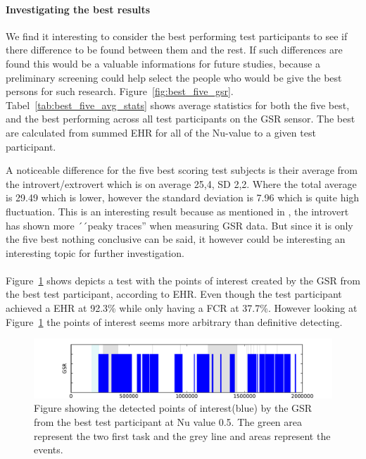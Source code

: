 \paragraph{Investigating the best results}
We find it interesting to consider the best performing test participants to see if there difference to be found between them and the rest. 
If such differences are found this would be a valuable informations for future studies, because a preliminary screening could help select the people who would be give the best persons for such research.
Figure~\ref{fig:best_five_gsr}. Tabel~\ref{tab:best_five_avg_stats} shows average statistics for both the five best, and
the best performing across all test participants on the GSR sensor. The best are calculated from summed EHR for all of the Nu-value to a given test participant.


A noticeable difference for the five best scoring test subjects is their average from the introvert/extrovert which is on average 25,4, SD 2,2.
Where the total average is 29.49 which is lower, however the standard deviation is 7.96 which is quite high fluctuation. This is an interesting result because as mentioned in \cite{extrovsintro}, the introvert has shown more ´´peaky traces'' when measuring GSR data.
But since it is only the five best nothing conclusive can be said, it however could be interesting an interesting topic for further investigation.\\\\
Figure~\ref{[Fig] best result} shows depicts a test with the points of interest created by the GSR from the best test participant, according to EHR.
Even though the test participant achieved a EHR at 92.3\%  while only having a FCR at 37.7\%. However looking at Figure~\ref{[Fig] best result} the points of interest seems more arbitrary than definitive detecting.
    \begin{figure}[H]
    \begin{minipage}[t]{0.5\textwidth}
        \includegraphics[width=\linewidth,keepaspectratio=true]{graphics/graphs/events/johnny-nu050-29-short-sensors.pdf}
        \caption{Figure showing the detected points of interest(blue) by the GSR from the best test participant at Nu value 0.5. The green area represent the two first task and the grey line and areas represent the events.}
        \label{[Fig] best result}
    \end{minipage}
    \end{figure}
